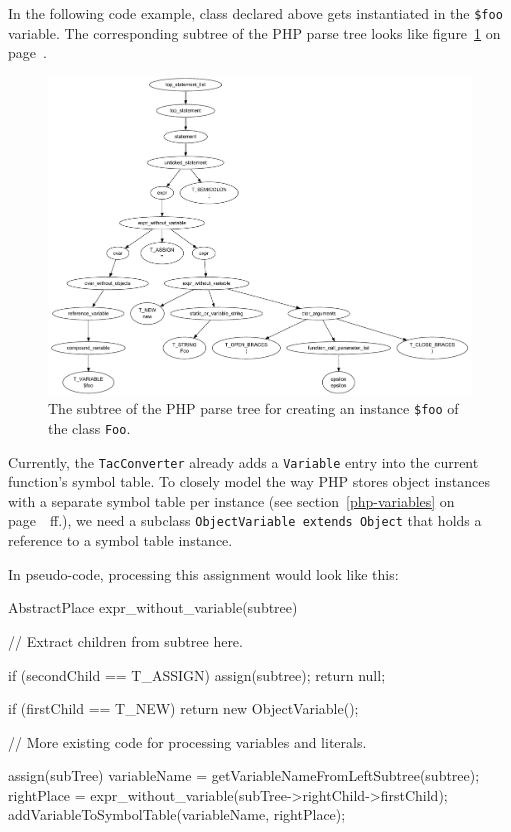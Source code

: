 In the following code example, class declared above gets instantiated in the \texttt{\$foo} variable. The corresponding subtree of the PHP parse tree looks like figure~\ref{fig:parse-tree-new-foo} on page~\pageref{fig:parse-tree-new-foo}.


\begin{figure}[htb]
  \begin{center}
    \includegraphics[scale=0.5]{images/parsetree-new-foo}
   \caption{The subtree of the PHP parse tree for creating an instance \texttt{\$foo} of the class \texttt{Foo}.}
   \label{fig:parse-tree-new-foo}
  \end{center}
\end{figure}

Currently, the \texttt{TacConverter} already adds a \texttt{Variable} entry into the current function's symbol table. To closely model the way PHP stores object instances with a separate symbol table per instance (see section~\ref{php-variables} on page~\pageref{php-variables}~ff.), we need a subclass \texttt{ObjectVariable extends Object} that holds a reference to a symbol table instance.

In pseudo-code, processing this assignment would look like this:

\begin{textcode}
AbstractPlace expr_without_variable(subtree) {
  // Extract children from subtree here.

  if (secondChild == T_ASSIGN) {
    assign(subtree);
    return null;
  }

  if (firstChild == T_NEW) {
    return new ObjectVariable();
  }

  // More existing code for processing variables and literals.
}

assign(subTree) {
  variableName = getVariableNameFromLeftSubtree(subtree);
  rightPlace = expr_without_variable(subTree->rightChild->firstChild);
  addVariableToSymbolTable(variableName, rightPlace);
}
\end{textcode}

